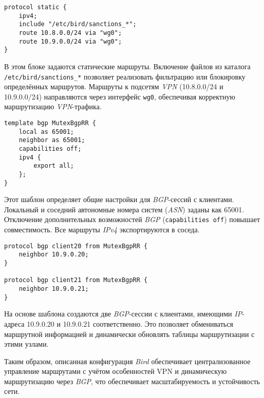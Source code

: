 \begin{lstlisting}
protocol static {
    ipv4;
    include "/etc/bird/sanctions_*";
    route 10.8.0.0/24 via "wg0";
    route 10.9.0.0/24 via "wg0";
}
\end{lstlisting}

В этом блоке задаются статические маршруты. Включение файлов из каталога \lstinline|/etc/bird/sanctions_*| позволяет реализовать фильтрацию или блокировку определённых маршрутов. Маршруты к подсетям \textit{VPN} (10.8.0.0/24 и 10.9.0.0/24) направляются через интерфейс \lstinline{wg0}, обеспечивая корректную маршрутизацию \textit{VPN}-трафика.

\begin{lstlisting}
template bgp MutexBgpRR {
    local as 65001;
    neighbor as 65001;
    capabilities off;
    ipv4 {
        export all;
    };
}
\end{lstlisting}

Этот шаблон определяет общие настройки для \textit{BGP}-сессий с клиентами. Локальный и соседний автономные номера систем (\textit{ASN}) заданы как 65001. Отключение дополнительных возможностей \textit{BGP} (\lstinline{capabilities off}) повышает совместимость. Все маршруты \textit{IPv4} экспортируются в соседа.

\begin{lstlisting}
protocol bgp client20 from MutexBgpRR {
    neighbor 10.9.0.20;
}

protocol bgp client21 from MutexBgpRR {
    neighbor 10.9.0.21;
}
\end{lstlisting}

На основе шаблона создаются две \textit{BGP}-сессии с клиентами, имеющими \textit{IP}-адреса 10.9.0.20 и 10.9.0.21 соответственно. Это позволяет обмениваться маршрутной информацией и динамически обновлять таблицы маршрутизации с этими узлами.

Таким образом, описанная конфигурация \textit{Bird} обеспечивает централизованное управление маршрутами с учётом особенностей VPN и динамическую маршрутизацию через \textit{BGP}, что обеспечивает масштабируемость и устойчивость сети.
